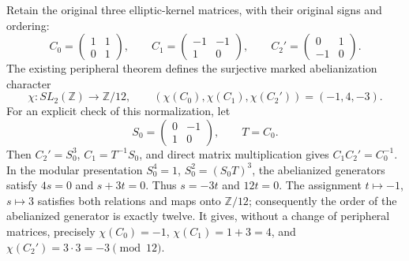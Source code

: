 Retain the original three elliptic-kernel matrices, with their
original signs and ordering:
\begin{equation}
C_0=\begin{pmatrix}1&1\\0&1\end{pmatrix},\qquad
C_1=\begin{pmatrix}-1&-1\\1&0\end{pmatrix},\qquad
C_2'=\begin{pmatrix}0&1\\-1&0\end{pmatrix}.
\label{h24:hbridge:eq:matrices}
\end{equation}
The existing peripheral theorem \cite{h24:hbridgebib:HBHigher} defines the
surjective marked abelianization character
\begin{equation}
\chi:SL_2(\mathbb Z)\longrightarrow\mathbb Z/12,
\qquad
(\chi(C_0),\chi(C_1),\chi(C_2'))=(-1,4,-3).
\label{h24:hbridge:eq:chi}
\end{equation}
For an explicit check of this normalization, let
\[
S_0=\begin{pmatrix}0&-1\\1&0\end{pmatrix},\qquad T=C_0.
\]
Then \(C_2'=S_0^3\), \(C_1=T^{-1}S_0\), and direct matrix
multiplication gives \(C_1C_2'=C_0^{-1}\). In the modular
presentation \(S_0^4=1\), \(S_0^2=(S_0T)^3\), the
abelianized generators satisfy \(4s=0\) and \(s+3t=0\).
Thus \(s=-3t\) and \(12t=0\). The assignment
\(t\mapsto-1\), \(s\mapsto3\) satisfies both relations and
maps onto \(\mathbb Z/12\); consequently the order of the
abelianized generator is exactly twelve. It gives, without a
change of peripheral matrices, precisely
\(\chi(C_0)=-1\), \(\chi(C_1)=1+3=4\), and
\(\chi(C_2')=3\cdot3=-3\pmod{12}\).

